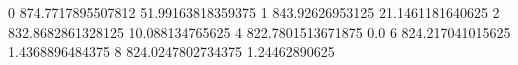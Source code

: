 0 874.7717895507812 51.99163818359375
1 843.92626953125 21.1461181640625
2 832.8682861328125 10.088134765625
4 822.7801513671875 0.0
6 824.217041015625 1.4368896484375
8 824.0247802734375 1.24462890625
